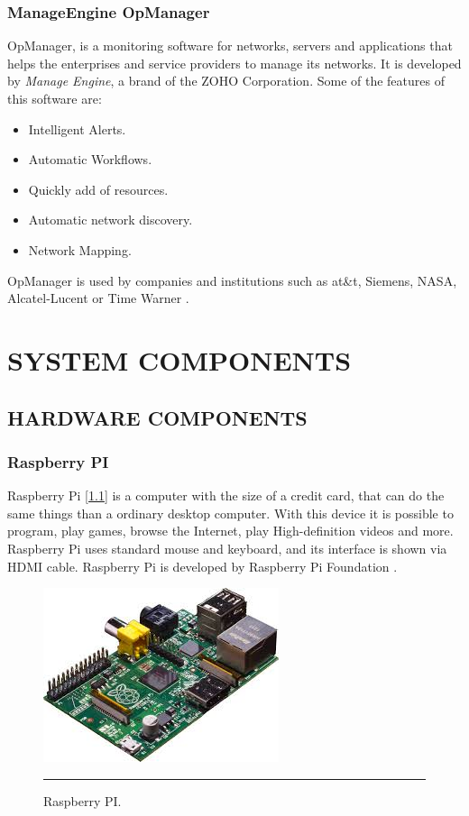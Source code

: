 \documentclass[12pt, a4paper,twoside]{tesi_upf}
\begin{document}
\subsection{ManageEngine OpManager}

OpManager, is a monitoring software for networks, servers and applications that helps the enterprises and service providers to manage its networks. It is developed by \textit{Manage Engine}, a brand of the ZOHO Corporation. Some of the features of this software are:
\begin{itemize}
\item Intelligent Alerts.
\item Automatic Workflows.
\item Quickly add of resources.
\item Automatic network discovery.
\item Network Mapping.
\end{itemize}

OpManager is used by companies and institutions such as at\&t, Siemens, NASA, Alcatel-Lucent or Time Warner \cite{opmanager}.


\chapter{SYSTEM COMPONENTS}
\label{Chapter3}

    \section{HARDWARE COMPONENTS}
        \subsection{Raspberry PI}
        Raspberry Pi [\ref{fig:raspberry}] is a computer with the size of a credit card, that can do the same things than a ordinary desktop computer. With this device it is possible to program, play games, browse the Internet, play High-definition videos and more. Raspberry Pi uses standard mouse and keyboard, and its interface is shown via HDMI cable. Raspberry Pi is developed by Raspberry Pi Foundation \cite{pi}.
        
        
        \begin{figure}[htbp]
          \centering
              \includegraphics[scale=0.8]{./figures/raspberrypi.png}
              \rule{32em}{0.7pt}
          \caption[Raspberry PI]{Raspberry PI.}
          \label{fig:raspberry}
        \end{figure}
        
\end{document}
